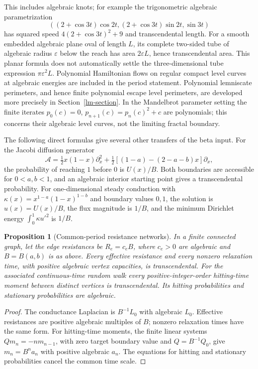 \documentclass[11pt,a4paper]{article}
\newtheorem{proposition}[theorem]{Proposition}
\theoremstyle{definition}
\theoremstyle{remark}
\numberwithin{equation}{section}
\begin{document}
This includes algebraic knots; for example the trigonometric algebraic
parametrization
\[
 ((2+\cos3t)\cos2t,(2+\cos3t)\sin2t,\sin3t)
\]
has squared speed $4(2+\cos3t)^2+9$ and transcendental length.
For a smooth embedded algebraic plane oval of length $L$, its complete
two-sided tube of algebraic radius $\varepsilon$ below the reach has
area $2\varepsilon L$, hence transcendental area.  This planar formula
does not automatically settle the three-dimensional tube expression
$\pi\varepsilon^2L$.
Polynomial Hamiltonian flows on regular compact level curves at
algebraic energies are included in the period statement.
Polynomial lemniscate perimeters, and hence finite polynomial escape
level perimeters, are developed more precisely in
Section~\ref{lm-section}.  In the Mandelbrot parameter setting the
finite iterates $p_0(c)=0$, $p_{n+1}(c)=p_n(c)^2+c$ are polynomials;
this concerns their algebraic level curves, not the limiting fractal
boundary.

The following direct formulas give several other transfers of the
beta input.  For the Jacobi diffusion generator
\[
 \mathcal A=\tfrac12x(1-x)\partial_x^2
  +\tfrac12[(1-a)-(2-a-b)x]\partial_x,
\]
the probability of reaching $1$ before $0$ is $U(x)/B$.
Both boundaries are accessible for $0<a,b<1$, and an algebraic
interior starting point gives a transcendental probability.
For one-dimensional steady conduction with
$\kappa(x)=x^{1-a}(1-x)^{1-b}$ and boundary values $0,1$, the solution
is $u(x)=U(x)/B$, the flux magnitude is $1/B$, and the minimum
Dirichlet energy $\int_0^1\kappa u'^2$ is $1/B$.
\label{tf-diffusion}

\begin{proposition}[Common-period resistance networks]\label{tf-networks}
In a finite connected graph, let the edge resistances be
$R_e=c_eB$, where $c_e>0$ are algebraic and $B=B(a,b)$ is as above.
Every effective resistance and every nonzero relaxation time, with
positive algebraic vertex capacities, is transcendental.
For the associated continuous-time random walk every positive-integer-order
hitting-time moment between distinct vertices is transcendental.
Its hitting probabilities and stationary probabilities are algebraic.
\end{proposition}
\begin{proof}
The conductance Laplacian is $B^{-1}L_0$ with algebraic $L_0$.
Effective resistances are positive algebraic multiples of $B$;
nonzero relaxation times have the same form.  For hitting-time moments,
the finite linear systems $Qm_n=-n m_{n-1}$, with zero target boundary
value and $Q=B^{-1}Q_0$, give $m_n=B^n a_n$ with positive algebraic
$a_n$.  The equations for hitting and stationary probabilities cancel
the common time scale.
\end{proof}
\end{document}
